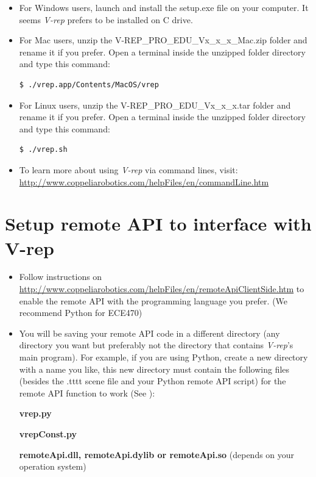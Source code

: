 \begin{itemize}
\item For Windows users, launch and install the setup.exe file on your computer. It seems \textit{V-rep} prefers to be installed on C drive.
\item For Mac users, unzip the V-REP\_PRO\_EDU\_Vx\_x\_x\_Mac.zip folder and rename it if you prefer. Open a terminal inside the unzipped folder directory and type this command: 
\begin{lstlisting}[language=bash]
$ ./vrep.app/Contents/MacOS/vrep
\end{lstlisting}
\item For Linux users, unzip the V-REP\_PRO\_EDU\_Vx\_x\_x.tar folder and rename it if you prefer. Open a terminal inside the unzipped folder directory and type this command: 
\begin{lstlisting}[language=bash]
$ ./vrep.sh
\end{lstlisting}
\item To learn more about using \textit{V-rep} via command lines, visit:
\url{http://www.coppeliarobotics.com/helpFiles/en/commandLine.htm}
\end{itemize}

\section{Setup remote API to interface with V-rep}
\begin{itemize}
\item Follow instructions on \url{http://www.coppeliarobotics.com/helpFiles/en/remoteApiClientSide.htm} to enable the remote API with the programming language you prefer. (We recommend Python for ECE470)

\item You will be saving your remote API code in a different directory (any directory you want but preferably not the directory that contains \textit{V-rep}'s main program). For example, if you are using Python, create a new directory with a name you like, this new directory must contain the following files (besides the .tttt scene file and your Python remote API script) for the remote API function to work (See ):

\textbf{vrep.py}

\textbf{vrepConst.py}

\textbf{remoteApi.dll, remoteApi.dylib or remoteApi.so} (depends on your operation system)

\end{itemize}

